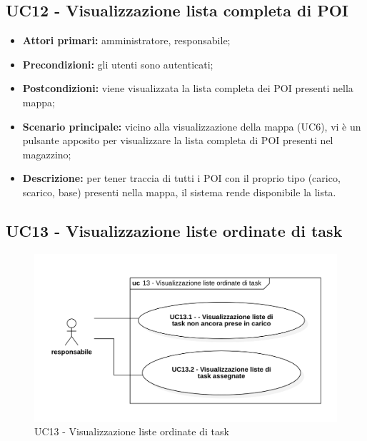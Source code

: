 \subsection{UC12 - Visualizzazione lista completa di POI}
\begin{itemize}
	\item 	\textbf{Attori primari:} amministratore, responsabile;
	\item 	\textbf{Precondizioni:} gli utenti sono autenticati;
	\item 	\textbf{Postcondizioni:} viene visualizzata la lista completa dei POI presenti nella mappa;
	\item 	\textbf{Scenario principale:} vicino alla visualizzazione della mappa (UC6), vi è un pulsante apposito per visualizzare la lista completa di POI presenti nel magazzino;
	\item 	\textbf{Descrizione:} per tener traccia di tutti i POI con il proprio tipo (carico, scarico, base) presenti nella mappa, il sistema rende disponibile la lista.

\end{itemize}

\subsection{UC13 - Visualizzazione liste ordinate di task}

\begin{figure}[H]
	\centering
	\includegraphics[scale=0.52]{res/images/uc13.png}
	\caption{UC13 - Visualizzazione liste ordinate di task}
\end{figure}

